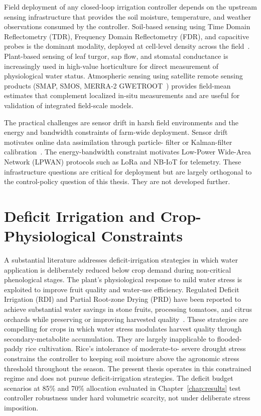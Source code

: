Field deployment of any closed-loop irrigation controller depends on
the upstream sensing infrastructure that provides the soil moisture,
temperature, and weather observations consumed by the controller.
Soil-based sensing using Time Domain Reflectometry (TDR), Frequency
Domain Reflectometry (FDR), and capacitive probes is the dominant
modality, deployed at cell-level density across the
field~\cite{Sharma2025,Bayar2025}. Plant-based sensing of leaf
turgor, sap flow, and stomatal conductance is increasingly used in
high-value horticulture for direct measurement of physiological water
status. Atmospheric sensing using satellite remote sensing products
(SMAP, SMOS, MERRA-2 GWETROOT~\cite{Afrasiabikia2026}) provides
field-mean estimates that complement localized in-situ measurements
and are useful for validation of integrated field-scale models.

The practical challenges are sensor drift in harsh field environments
and the energy and bandwidth constraints of farm-wide deployment.
Sensor drift motivates online data assimilation through particle-
filter or Kalman-filter calibration~\cite{Maniam2026}. The
energy-bandwidth constraint motivates Low-Power Wide-Area Network
(LPWAN) protocols such as LoRa and NB-IoT for telemetry. These
infrastructure questions are critical for deployment but are largely
orthogonal to the control-policy question of this thesis. They are
not developed further.

\section{Deficit Irrigation and Crop-Physiological Constraints}
\label{sec:lit-deficit}

A substantial literature addresses deficit-irrigation strategies in
which water application is deliberately reduced below crop demand
during non-critical phenological stages. The plant's physiological
response to mild water stress is exploited to improve fruit quality
and water-use efficiency. Regulated Deficit Irrigation (RDI) and
Partial Root-zone Drying (PRD) have been reported to achieve
substantial water savings in stone fruits, processing tomatoes, and
citrus orchards while preserving or improving harvested
quality~\cite{Sharma2025}. These strategies are compelling for crops
in which water stress modulates harvest quality through
secondary-metabolite accumulation. They are largely inapplicable to
flooded-paddy rice cultivation. Rice's intolerance of moderate-to-
severe drought stress~\cite{jalali2021,raoufi2025} constrains the
controller to keeping soil moisture above the agronomic stress
threshold throughout the season. The present thesis operates in this
constrained regime and does not pursue deficit-irrigation strategies.
The deficit budget scenarios at 85\% and 70\% allocation evaluated in
Chapter~\ref{chap:results} test controller robustness under hard
volumetric scarcity, not under deliberate stress imposition.

